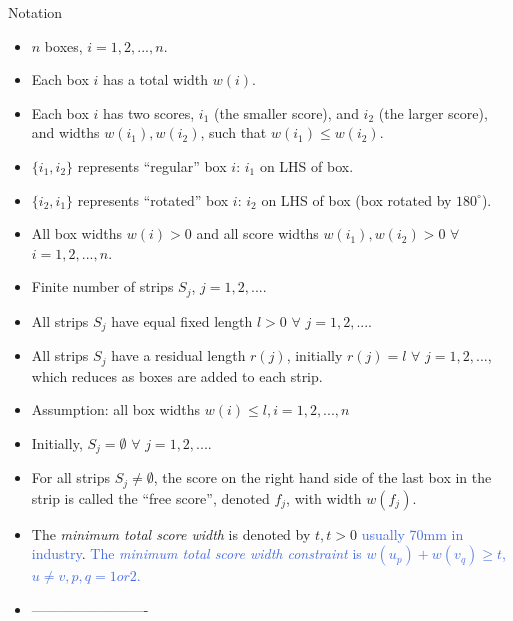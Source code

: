\documentclass[oribibl]{llncs}
\begin{document}
Notation
\begin{itemize}
	\item $n$ boxes, $i = 1, 2, ..., n$.
	\item Each box $i$ has a total width $w(i)$.
	\item Each box $i$ has two scores, $i_1$ (the smaller score), and $i_2$ (the larger score), and widths $w(i_1), w(i_2)$, such that $w(i_1) \leq w(i_2)$.
	\item $\{i_1, i_2\}$ represents ``regular'' box $i$: $i_1$ on LHS of box.
	\item $\{i_2, i_1\}$ represents ``rotated'' box $i$: $i_2$ on LHS of box (box rotated by $180^{\circ}$).
	\item All box widths $w(i) > 0$ and all score widths $w(i_1), w(i_2) > 0$ $\forall$ $i = 1, 2, ..., n$.
	\item Finite number of strips $S_j$, $j = 1, 2, ...$.
	\item All strips $S_j$ have equal fixed length $l > 0$ $\forall$ $j = 1, 2, ...$.
	\item All strips $S_j$ have a residual length $r(j)$, initially $r(j) = l$ $\forall$ $j = 1,2, ...$, which reduces as boxes are added to each strip.
	\item Assumption: all box widths $w(i) \leq l, i = 1, 2, ..., n$
	\item Initially, $S_j = \emptyset$ $\forall$ $j = 1, 2, ...$.
	\item For all strips $S_j \neq \emptyset$, the score on the right hand side of the last box in the strip is called the ``free score'', denoted $f_j$, with width $w(f_j)$.
	\item The \textit{minimum total score width} is denoted by $t, t > 0$ \textcolor{RoyalBlue}{usually 70mm in industry}. \textcolor{RoyalBlue}{The \textit{minimum total score width constraint} is $w(u_p) + w(v_q) \geq t$, $u \neq v, p, q = 1 or 2$.}
	
	\item -------------------------
	

\end{itemize}
\end{document}
